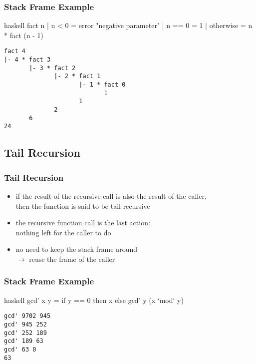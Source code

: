 \documentclass[dvipsnames]{beamer}
\theoremstyle{plain}
\begin{document}
\begin{frame}[fragile]
  \frametitle{Stack Frame Example}

  \begin{exampleblock}{}
    \begin{pygments}{haskell}
fact n
  | n < 0     = error "negative parameter"
  | n == 0    = 1
  | otherwise = n * fact (n - 1)
    \end{pygments}

    \begin{verbatim}
fact 4
|- 4 * fact 3
       |- 3 * fact 2
              |- 2 * fact 1
                     |- 1 * fact 0
                            1
                     1
              2
       6
24
    \end{verbatim}
  \end{exampleblock}
\end{frame}

\subsection{Tail Recursion}

\begin{frame}
  \frametitle{Tail Recursion}

  \begin{itemize}
    \item if the result of the recursive call is also the result of the caller,\\
      then the function is said to be \alert{tail recursive}
    \item the recursive function call is the last action:\\
      nothing left for the caller to do

    \pause
    \medskip
    \item no need to keep the stack frame around\\
      $\rightarrow$ reuse the frame of the caller
  \end{itemize}
\end{frame}

\begin{frame}[fragile]
  \frametitle{Stack Frame Example}

  \begin{exampleblock}{}
    \begin{pygments}{haskell}
gcd' x y = if y == 0 then x else gcd' y (x `mod` y)
    \end{pygments}

    \begin{verbatim}
gcd' 9702 945
gcd' 945 252
gcd' 252 189
gcd' 189 63
gcd' 63 0
63
    \end{verbatim}
  \end{exampleblock}
\end{frame}
\end{document}
